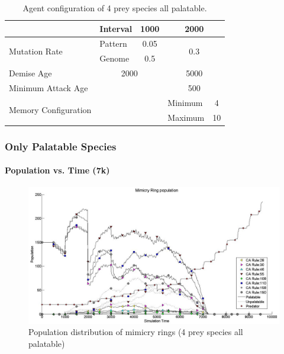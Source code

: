 {\begin{table}[H]
\begin{spacing}{1.5}
\begin{tiny}
\begin{tabular}{|l|l|c|c|l|c|}
	  						 									& Interval  & \multicolumn{2}{c|}{1000} & \multicolumn{2}{c|}{2000} \\ \hline
	  \multirow{2}{*}{Mutation Rate} & Pattern   & \multicolumn{2}{c|}{0.05} & \multicolumn{2}{c|}{\multirow{2}{*}{0.3}} \\ \cline{2-4}
	  						 									 & Genome    & \multicolumn{2}{c|}{0.5}  & \multicolumn{2}{c|}{} \\ \hline
	  Demise Age	 									 & \multicolumn{3}{c|}{2000}							& \multicolumn{2}{c|}{5000} \\ \hline
	  Minimum Attack Age						 & \multicolumn{3}{c|}{} 						    & \multicolumn{2}{c|}{500} \\ \hline
	  \multirow{2}{*}{Memory Configuration} & \multicolumn{3}{c|}{} 					& Minimum & 4 \\ \cline{5-6}
	   																			& \multicolumn{3}{c|}{} 					& Maximum & 10 \\ \hline  
	\end{tabular}
	\end{tiny}
	\end{spacing}
	\caption{Agent configuration of 4 prey species all palatable.}
	\label{tab:config-table-4-prey-palatable}
	\end{table}

}

\frame
{
	\frametitle{Only Palatable Species}
	\framesubtitle{Population vs. Time (7k)}

\begin{figure}[H]
	\centering
	\includegraphics[scale=0.25]{../tex/images/simTime10k-4Prey-p}
	\caption{Population distribution of mimicry rings (4 prey species all palatable)}
	\label{fig:plot-4-prey-p}
\end{figure}
}


